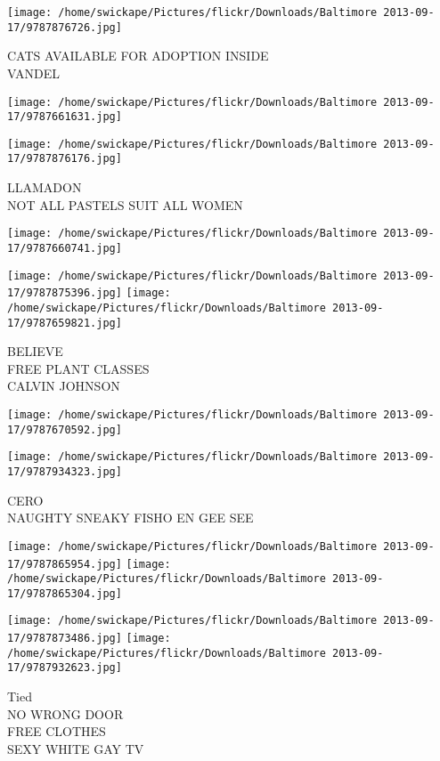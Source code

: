 \documentclass[10pt,letterpaper]{article}
\begin{document}
\vspace{0.25in}
\texttt{[image: /home/swickape/Pictures/flickr/Downloads/Baltimore 2013-09-17/9787876726.jpg]}

CATS AVAILABLE FOR ADOPTION INSIDE\\
VANDEL
\pagebreak

\texttt{[image: /home/swickape/Pictures/flickr/Downloads/Baltimore 2013-09-17/9787661631.jpg]}

\vspace{0.25in}
\texttt{[image: /home/swickape/Pictures/flickr/Downloads/Baltimore 2013-09-17/9787876176.jpg]}

LLAMADON\\
NOT ALL PASTELS SUIT ALL WOMEN
\pagebreak

\texttt{[image: /home/swickape/Pictures/flickr/Downloads/Baltimore 2013-09-17/9787660741.jpg]}

\vspace{0.25in}
\texttt{[image: /home/swickape/Pictures/flickr/Downloads/Baltimore 2013-09-17/9787875396.jpg]}
\texttt{[image: /home/swickape/Pictures/flickr/Downloads/Baltimore 2013-09-17/9787659821.jpg]}

BELIEVE\\
FREE PLANT CLASSES\\
CALVIN JOHNSON
\pagebreak

\texttt{[image: /home/swickape/Pictures/flickr/Downloads/Baltimore 2013-09-17/9787670592.jpg]}

\vspace{0.25in}
\texttt{[image: /home/swickape/Pictures/flickr/Downloads/Baltimore 2013-09-17/9787934323.jpg]}

CERO\\
NAUGHTY SNEAKY FISHO EN GEE SEE
\pagebreak

\texttt{[image: /home/swickape/Pictures/flickr/Downloads/Baltimore 2013-09-17/9787865954.jpg]}
\texttt{[image: /home/swickape/Pictures/flickr/Downloads/Baltimore 2013-09-17/9787865304.jpg]}

\texttt{[image: /home/swickape/Pictures/flickr/Downloads/Baltimore 2013-09-17/9787873486.jpg]}
\texttt{[image: /home/swickape/Pictures/flickr/Downloads/Baltimore 2013-09-17/9787932623.jpg]}

Tied\\
NO WRONG DOOR\\
FREE CLOTHES\\
SEXY WHITE GAY TV
\pagebreak
\end{document}
